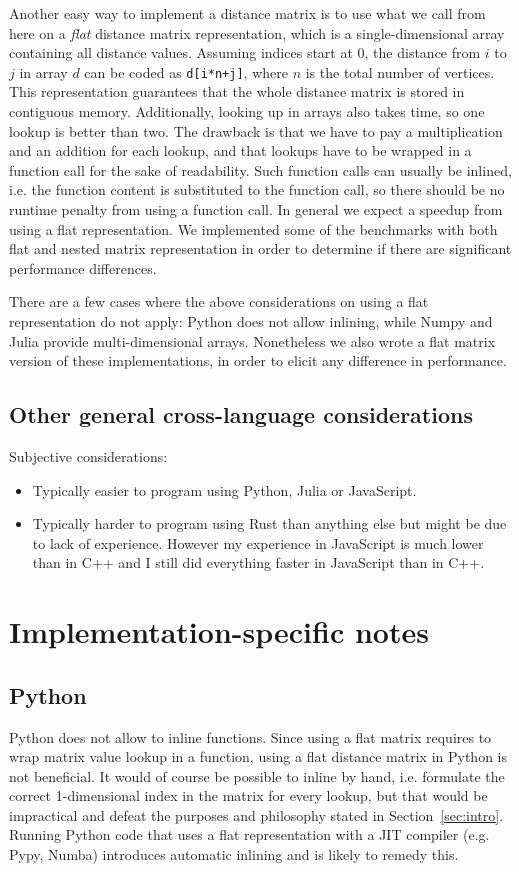 \documentclass[11pt,a4paper,notitlepage]{article}
\begin{document}
Another easy way to implement a distance matrix is to use what we
call from here on a \emph{flat} distance matrix representation, which
is a single-dimensional array containing all distance values. Assuming
indices start at 0, the distance from $i$ to $j$ in array $d$ can be
coded as \lstinline{d[i*n+j]}, where $n$ is the total number of
vertices. This representation guarantees that the whole distance
matrix is stored in contiguous memory. Additionally, looking up in
arrays also takes time, so one lookup is better than two. The drawback
is that we have to pay a multiplication and an addition for each
lookup, and that lookups have to be wrapped in a function call for the
sake of readability. Such function calls can usually be inlined,
i.e. the function content is substituted to the function call, so
there should be no runtime penalty from using a function call. In
general we expect a speedup from using a flat representation. We
implemented some of the benchmarks with both flat and nested matrix
representation in order to determine if there are significant
performance differences.

There are a few cases where the above considerations on using a flat
representation do not apply: Python does not allow inlining, while
Numpy and Julia provide multi-dimensional arrays. Nonetheless we also
wrote a flat matrix version of these implementations, in order
to elicit any difference in performance. 

\subsection{Other general cross-language considerations}
Subjective considerations:
\begin{itemize}
\item Typically easier to program using Python, Julia or JavaScript.
\item Typically harder to program using Rust than anything else but
  might be due to lack of experience. However my experience in
  JavaScript is much lower than in C++ and I still did everything
  faster in JavaScript than in C++.
\end{itemize}


\section{Implementation-specific notes}
\subsection{Python}
Python does not allow to inline functions. Since using a flat matrix
requires to wrap matrix value lookup in a function, using a flat distance
matrix in Python is not beneficial. It would of course be possible to
inline by hand, i.e. formulate the correct 1-dimensional index in the
matrix for every lookup, but that would be impractical and defeat the
purposes and philosophy stated in Section~\ref{sec:intro}.
Running Python code that uses a flat representation with a JIT compiler
(e.g. Pypy, Numba) introduces automatic inlining and is likely to
remedy this.
\end{document}
